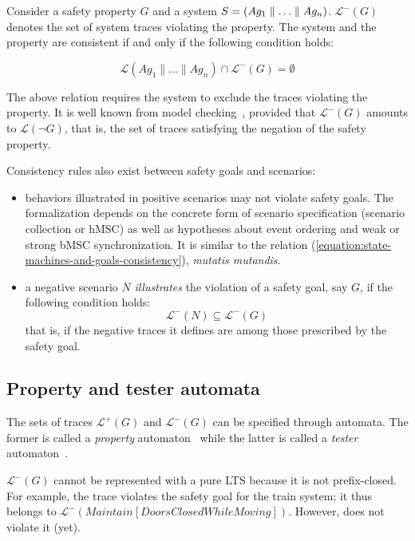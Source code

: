 Consider a safety property $G$ and a system $S = (Ag_1 \parallel \ldots \parallel Ag_n)$. $\mathcal{L}^{-}(G)$ denotes the set of system traces violating the property. The system and the property are consistent if and only if the following condition holds:

\begin{equation}
\mathcal{L}(Ag_1 \parallel \ldots \parallel Ag_n) \cap \mathcal{L}^{-}(G) = \emptyset
\label{equation:state-machines-and-goals-consistency}
\end{equation}

The above relation requires the system to exclude the traces violating the property. It is well known from model checking~\cite{Clarke:1989}, provided that $\mathcal{L}^{-}(G)$ amounts to $\mathcal{L}(\neg G)$, that is, the set of traces satisfying the negation of the safety property. 

Consistency rules also exist between safety goals and scenarios:

\begin{itemize}
\item behaviors illustrated in positive scenarios may not violate safety goals. The formalization depends on the concrete form of scenario specification (scenario collection or hMSC) as well as hypotheses about event ordering and weak or strong bMSC synchronization. It is similar to the relation (\ref{equation:state-machines-and-goals-consistency}), \emph{mutatis mutandis}.
\item a negative scenario $N$ \emph{illustrates} the violation of a safety goal, say $G$, if the following condition holds:
\begin{equation}
\mathcal{L}^{-}(N) \subseteq \mathcal{L}^{-}(G)
\end{equation}
\noindent that is, if the negative traces it defines are among those prescribed by the safety goal.
\end{itemize}

\subsection{Property and tester automata\label{subsection:background-property-and-tester-automata}}

The sets of traces $\mathcal{L}^{+}(G)$ and $\mathcal{L}^{-}(G)$ can be specified through automata. The former is called a \emph{property} automaton~\cite{Letier:2005, Letier:2008} while the latter is called a \emph{tester} automaton~\cite{Giannakopoulou:2003}.

$\mathcal{L}^{-}(G)$ cannot be represented with a pure LTS because it is not prefix-closed. For example, the trace  violates the safety goal for the train system; it thus belongs to $\mathcal{L}^{-}(Maintain[DoorsClosed While Moving])$. However,  does not violate it (yet). 

